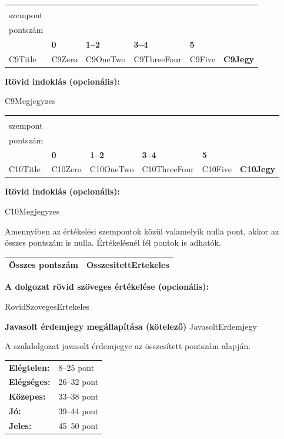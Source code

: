\documentclass[a4paper,12pt]{article}
\newcommand{\EvaluationTable}[7]{

\renewcommand{\arraystretch}{1.35}

{\fontsize{8pt}{9.5pt}\selectfont

\begin{tabularx}{\textwidth}{|
>{\raggedright\arraybackslash}p{3.5cm}|
>{\raggedright\arraybackslash}X|
>{\raggedright\arraybackslash}X|
>{\raggedright\arraybackslash}X|
>{\raggedright\arraybackslash}X|
>{\centering\arraybackslash}m{1.8cm}|}

\hline

\multirow{2}{=}{\centering\textbf{Értékelési\\szempont}}
&
\multicolumn{4}{c|}{\textbf{Adható pontszám}}
&
\multirow{2}{=}{\centering\textbf{Elért\\pontszám}}
\\

\cline{2-5}

&
\textbf{0}
&
\textbf{1--2}
&
\textbf{3--4}
&
\textbf{5}
&
\\

\hline

#1
&
#2
&
#3
&
#4
&
#5
&
\textbf{#6}

\\
\hline

\end{tabularx}

\vspace{3mm}

\textbf{Rövid indoklás (opcionális):}

\vspace{2mm}

#7

\vspace{8mm}

}
}
\begin{document}
\EvaluationTable
{ {{C9Title}} }
{ {{C9Zero}} }
{ {{C9OneTwo}} }
{ {{C9ThreeFour}} }
{ {{C9Five}} }
{ {{C9Jegy}} }
{ {{C9Megjegyzes}} }

\EvaluationTable
{ {{C10Title}} }
{ {{C10Zero}} }
{ {{C10OneTwo}} }
{ {{C10ThreeFour}} }
{ {{C10Five}} }
{ {{C10Jegy}} }
{ {{C10Megjegyzes}} }

\bigskip

Amennyiben az értékelési szempontok közül valamelyik nulla pont, akkor az összes pontszám is nulla. Értékelésnél fél pontok is adhatók.

\bigskip

\begin{center}

\begin{tabular}{|l|c|}
\hline

\textbf{Összes pontszám} &
\textbf{{{OsszesitettErtekeles}}}

\\
\hline

\end{tabular}

\end{center}

\bigskip

\textbf{A dolgozat rövid szöveges értékelése (opcionális):}

\vspace{0.3cm}

{{RovidSzovegesErtekeles}}

\vspace{1cm}

\textbf{Javasolt érdemjegy megállapítása (kötelező)} {{JavasoltErdemjegy}}

\vspace{0.3cm}

A szakdolgozat javasolt érdemjegye az összesített pontszám alapján.

\bigskip

\begin{tabular}{ll}

\textbf{Elégtelen:} & 8--25 pont \\

\textbf{Elégséges:} & 26--32 pont \\

\textbf{Közepes:} & 33--38 pont \\

\textbf{Jó:} & 39--44 pont \\

\textbf{Jeles:} & 45--50 pont \\

\end{tabular}
\end{document}
